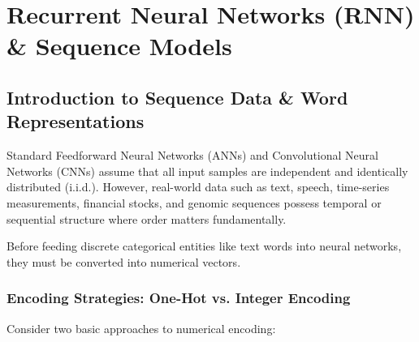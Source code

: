 \chapter{Recurrent Neural Networks (RNN) \& Sequence Models}

\section{Introduction to Sequence Data \& Word Representations}

Standard Feedforward Neural Networks (ANNs) and Convolutional Neural Networks (CNNs) assume that all input samples are independent and identically distributed (i.i.d.). However, real-world data such as text, speech, time-series measurements, financial stocks, and genomic sequences possess temporal or sequential structure where order matters fundamentally.

Before feeding discrete categorical entities like text words into neural networks, they must be converted into numerical vectors.

\subsection{Encoding Strategies: One-Hot vs. Integer Encoding}

Consider two basic approaches to numerical encoding:

